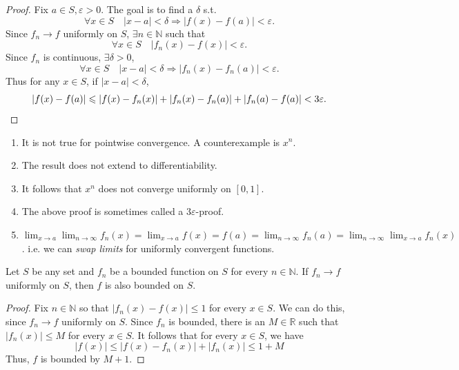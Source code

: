 \documentclass[a4paper]{article}
\renewcommand{\epsilon}{\varepsilon}
\begin{document}
\begin{proof}
    Fix $ a\in S, \epsilon>0 $. The goal is to find a $ \delta $ s.t. 
    \[
        \forall x\in S\quad |x-a|<\delta \Longrightarrow |f(x)-f(a)|<\epsilon.
    \]
    Since $ f_n\to f $ uniformly on $S$, $ \exists n\in \mathbb{N} $ such that 
    \[
        \forall x\in S\quad |f_n(x)-f(x)|<\epsilon.
    \]
    Since $f_n$ is continuous, $ \exists \delta>0 $, 
    \[
        \forall x\in S\quad |x-a|<\delta \Longrightarrow |f_n(x)-f_n(a)|<\epsilon.
    \]
    Thus for any $x\in S$, if $ |x-a|<\delta $,
    \[
        |f(x)-f(a)|\le |f(x)-f_n(x)|+|f_n(x)-f_n(a)|+|f_n(a)-f(a)|<3\epsilon.\qedhere
    \]
\end{proof}
\begin{remark}
    \begin{enumerate}
        \item It is not true for pointwise convergence. A counterexample is $x^n$.
        \item The result does not extend to differentiability.
        \item It follows that $x^{n}$ does not converge uniformly on $[0,1]$.
        \item The above proof is sometimes called a $3 \varepsilon$-proof.
        \item $\displaystyle \lim _{x \rightarrow a} \lim _{n \rightarrow \infty} f_{n}(x)=\lim _{x \rightarrow a} f(x)=f(a)=\lim _{n \rightarrow \infty} f_{n}(a)=\lim _{n \rightarrow \infty} \lim _{x \rightarrow a} f_{n}(x)$. i.e. we can \textit{swap limits} for uniformly convergent functions.
    \end{enumerate}
\end{remark}

\begin{lemma}\label{lemma 2}
    Let $S$ be any set and $f_{n}$ be a bounded function on $S$ for every $n \in \mathbb{N}$. If $f_{n} \rightarrow f$ uniformly on $S$, then $f$ is also bounded on $S$.
\end{lemma}
\begin{proof}
    Fix $n \in \mathbb{N}$ so that $\left|f_{n}(x)-f(x)\right| \leqslant 1$ for every $x \in S$. We can do this, since $f_{n} \rightarrow f$ uniformly on $S$. Since $f_{n}$ is bounded, there is an $M \in \mathbb{R}$ such that $\left|f_{n}(x)\right| \leqslant M$ for every $x \in S$. It follows that for every $x \in S$, we have
    \[
    |f(x)| \leqslant\left|f(x)-f_{n}(x)\right|+\left|f_{n}(x)\right| \leqslant 1+M
    \]
    Thus, $f$ is bounded by $M+1$.
\end{proof}
\end{document}
